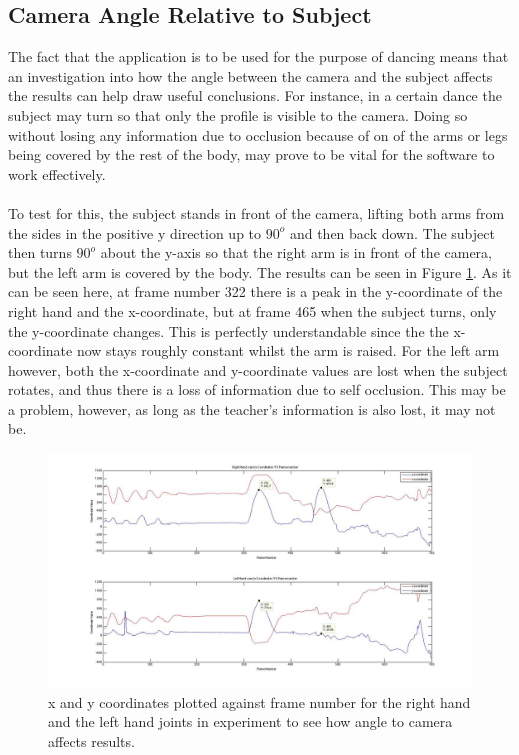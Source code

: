 \documentclass[a4paper]{article}
\begin{document}
\subsection{Camera Angle Relative to Subject}
\noindent 
The fact that the application is to be used for the purpose of dancing means that an investigation into how the angle between the camera and the subject affects the results can help draw useful conclusions. For instance, in a certain dance the subject may turn so that only the profile is visible to the camera. Doing so without losing any information due to occlusion because of on of the arms or legs being covered by the rest of the body, may prove to be vital for the software to work effectively. 
\\\\
\noindent
To test for this, the subject stands in front of the camera, lifting both arms from the sides in the positive y direction up to $90^o$ and then back down. The subject then turns $90^o$ about the y-axis so that the right arm is in front of the camera, but the left arm is covered by the body. The results can be seen in Figure \ref{angle_camera}. As it can be seen here, at frame number 322 there is a peak in the y-coordinate of the right hand and the x-coordinate, but at frame 465 when the subject turns, only the y-coordinate changes. This is perfectly understandable since the the x-coordinate now stays roughly constant whilst the arm is raised. For the left arm however, both the x-coordinate and y-coordinate values are lost when the subject rotates, and thus there is a loss of information due to self occlusion. This may be a problem, however, as long as the teacher's information is also lost, it may not be.  
\begin{figure}[H]
\centering
\includegraphics[scale=0.2]{Angle_To_Camera.jpg}
\caption{x and y coordinates plotted against frame number for the right hand and the left hand joints in experiment to see how angle to camera affects results.}
\label{angle_camera}
\end{figure}
 
\end{document}
